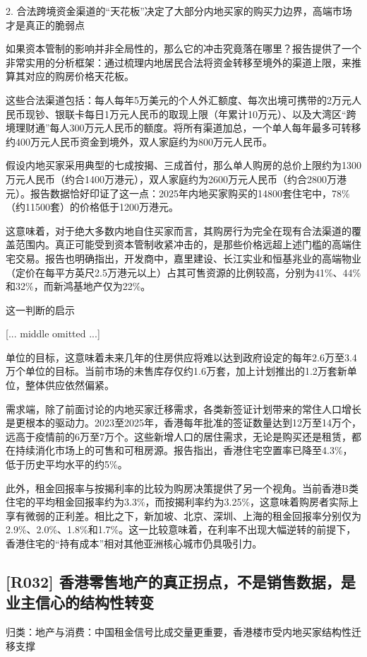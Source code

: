 \documentclass[11pt]{ctexart}
\begin{document}
2. 合法跨境资金渠道的“天花板”决定了大部分内地买家的购买力边界，高端市场才是真正的脆弱点

如果资本管制的影响并非全局性的，那么它的冲击究竟落在哪里？报告提供了一个非常实用的分析框架：通过梳理内地居民合法将资金转移至境外的渠道上限，来推算其对应的购房价格天花板。

这些合法渠道包括：每人每年5万美元的个人外汇额度、每次出境可携带的2万元人民币现钞、银联卡每日1万元人民币的取现上限（年累计10万元）、以及大湾区“跨境理财通”每人300万元人民币的额度。将所有渠道加总，一个单人每年最多可转移约400万元人民币资金到境外，双人家庭约为800万元人民币。

假设内地买家采用典型的七成按揭、三成首付，那么单人购房的总价上限约为1300万元人民币（约合1400万港元），双人家庭约为2600万元人民币（约合2800万港元）。报告数据恰好印证了这一点：2025年内地买家购买的14800套住宅中，78\%（约11500套）的价格低于1200万港元。

这意味着，对于绝大多数内地自住买家而言，其购房行为完全在现有合法渠道的覆盖范围内。真正可能受到资本管制收紧冲击的，是那些价格远超上述门槛的高端住宅交易。报告也明确指出，开发商中，嘉里建设、长江实业和恒基兆业的高端物业（定价在每平方英尺2.5万港元以上）占其可售资源的比例较高，分别为41\%、44\%和32\%，而新鸿基地产仅为22\%。

这一判断的启示

[... middle omitted ...]

单位的目标，这意味着未来几年的住房供应将难以达到政府设定的每年2.6万至3.4万个单位的目标。当前市场的未售库存仅约1.6万套，加上计划推出的1.2万套新单位，整体供应依然偏紧。

需求端，除了前面讨论的内地买家迁移需求，各类新签证计划带来的常住人口增长是更根本的驱动力。2023至2025年，香港每年批准的签证数量达到12万至14万个，远高于疫情前的6万至7万个。这些新增人口的居住需求，无论是购买还是租赁，都在持续消化市场上的可售和可租房源。报告指出，香港住宅空置率已降至4.3\%，低于历史平均水平的约5\%。

此外，租金回报率与按揭利率的比较为购房决策提供了另一个视角。当前香港B类住宅的平均租金回报率约为3.3\%，而按揭利率约为3.25\%，这意味着购房者实际上享有微弱的正利差。相比之下，新加坡、北京、深圳、上海的租金回报率分别仅为2.9\%、2.0\%、1.8\%和1.7\%。这一比较意味着，在利率不出现大幅逆转的前提下，香港住宅的“持有成本”相对其他亚洲核心城市仍具吸引力。

\subsection{[R032] 香港零售地产的真正拐点，不是销售数据，是业主信心的结构性转变}
{\small\color{refgray}归类：地产与消费：中国租金信号比成交量更重要，香港楼市受内地买家结构性迁移支撑}
\end{document}
